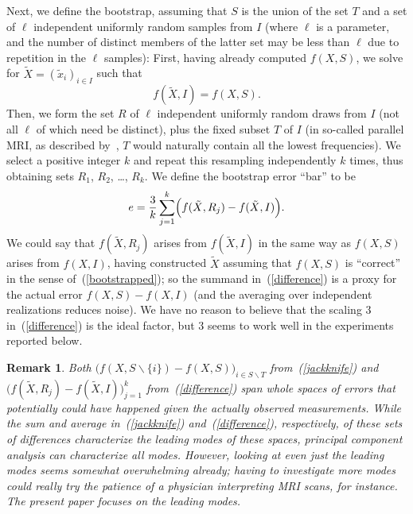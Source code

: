 \documentclass[article]{jdssv}
\newtheorem{remark1}[theorem]{Remark}
\newenvironment{remark}{\begin{remark1} \rm}{\end{remark1}}
\begin{document}
Next, we define the bootstrap, assuming that $S$ is the union of the set $T$
and a set of $\ell$ independent uniformly random samples from $I$
(where $\ell$ is a parameter, and the number of distinct members
of the latter set may be less than $\ell$ due to repetition
in the $\ell$ samples):
First, having already computed $f(X, S)$,
we solve for $\tilde{X} = (\tilde{x}_i)_{i \in I}$ such that
%
\begin{equation}
\label{bootstrapped}
f(\tilde{X}, I) = f(X, S).
\end{equation}
%
Then, we form the set $R$ of $\ell$ independent uniformly random draws from $I$
(not all $\ell$ of which need be distinct),
plus the fixed subset $T$ of $I$ (in so-called parallel MRI,
as described by~\citet{brown-cheng-haacke-thompson-venkatesan},
$T$ would naturally contain all the lowest frequencies).
We select a positive integer $k$ and repeat this resampling independently
$k$ times, thus obtaining sets $R_1$, $R_2$, \dots, $R_k$.
We define the bootstrap error ``bar'' to be
%
\begin{equation}
\label{difference}
e = \frac{3}{k} \sum_{j = 1}^k
    \Bigl( f(\tilde{X}, R_j) - f(\tilde{X}, I) \Bigr).
\end{equation}
%
We could say that $f(\tilde{X}, R_j)$ arises from $f(\tilde{X}, I)$
in the same way as $f(X, S)$ arises from $f(X, I)$,
having constructed $\tilde{X}$ assuming that $f(X, S)$ is ``correct''
in the sense of~(\ref{bootstrapped}); so the summand in~(\ref{difference})
is a proxy for the actual error $f(X, S) - f(X, I)$
(and the averaging over independent realizations reduces noise).
We have no reason to believe that the scaling $3$ in~(\ref{difference})
is the ideal factor, but $3$ seems to work well in the experiments
reported below.

\begin{remark}
Both $\bigl( f(X, S \backslash \{i\}) - f(X, S) \bigr)_{i \in S \backslash T}$
from~(\ref{jackknife})
and $\bigl( f(\tilde{X}, R_j) - f(\tilde{X}, I) \bigr)_{j = 1}^k$
from~(\ref{difference})
span whole spaces of errors that potentially could have happened
given the actually observed measurements.
While the sum and average in~(\ref{jackknife}) and~(\ref{difference}),
respectively, of these sets of differences characterize the leading modes
of these spaces, principal component analysis can characterize all modes.
However, looking at even just the leading modes seems somewhat overwhelming
already; having to investigate more modes could really try the patience
of a physician interpreting MRI scans, for instance.
The present paper focuses on the leading modes.
\end{remark}
\end{document}
